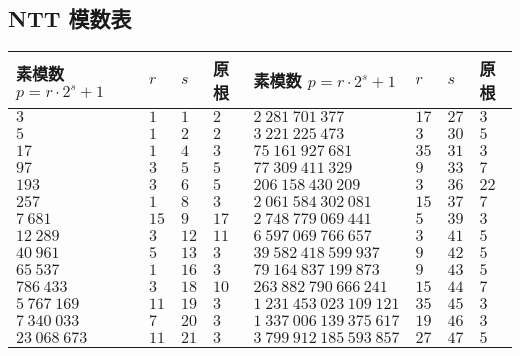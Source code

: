 \subsection{NTT 模数表}

\begin{tabular}{llll|llll}
    \hline
    素模数 \(p=r\cdot 2^s+1\)  & \(r\)   & \(s\)  & 原根   & 素模数 \(p=r\cdot 2^s+1\)     & \(r\)  & \(s\)  & 原根   \\
    \hline
    \(3\)                      & \(1\)   & \(1\)  & \(2\)  & \(2~281~701~377\)             & \(17\) & \(27\) & \(3\)  \\
    \(5\)                      & \(1\)   & \(2\)  & \(2\)  & \(3~221~225~473\)             & \(3\)  & \(30\) & \(5\)  \\
    \(17\)                     & \(1\)   & \(4\)  & \(3\)  & \(75~161~927~681\)            & \(35\) & \(31\) & \(3\)  \\
    \(97\)                     & \(3\)   & \(5\)  & \(5\)  & \(77~309~411~329\)            & \(9\)  & \(33\) & \(7\)  \\
    \(193\)                    & \(3\)   & \(6\)  & \(5\)  & \(206~158~430~209\)           & \(3\)  & \(36\) & \(22\) \\
    \(257\)                    & \(1\)   & \(8\)  & \(3\)  & \(2~061~584~302~081\)         & \(15\) & \(37\) & \(7\)  \\
    \(7~681\)                  & \(15\)  & \(9\)  & \(17\) & \(2~748~779~069~441\)         & \(5\)  & \(39\) & \(3\)  \\
    \(12~289\)                 & \(3\)   & \(12\) & \(11\) & \(6~597~069~766~657\)         & \(3\)  & \(41\) & \(5\)  \\
    \(40~961\)                 & \(5\)   & \(13\) & \(3\)  & \(39~582~418~599~937\)        & \(9\)  & \(42\) & \(5\)  \\
    \(65~537\)                 & \(1\)   & \(16\) & \(3\)  & \(79~164~837~199~873\)        & \(9\)  & \(43\) & \(5\)  \\
    \(786~433\)                & \(3\)   & \(18\) & \(10\) & \(263~882~790~666~241\)       & \(15\) & \(44\) & \(7\)  \\
    \(5~767~169\)              & \(11\)  & \(19\) & \(3\)  & \(1~231~453~023~109~121\)     & \(35\) & \(45\) & \(3\)  \\
    \(7~340~033\)              & \(7\)   & \(20\) & \(3\)  & \(1~337~006~139~375~617\)     & \(19\) & \(46\) & \(3\)  \\
    \(23~068~673\)             & \(11\)  & \(21\) & \(3\)  & \(3~799~912~185~593~857\)     & \(27\) & \(47\) & \(5\)  \\

\end{tabular}
